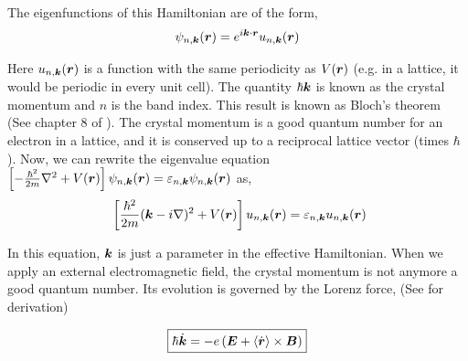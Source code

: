\documentclass{report}
\renewcommand\vec[1]{\ensuremath\boldsymbol{#1}} %
\begin{document}
The eigenfunctions of this Hamiltonian are of the form,
$$\psi_{n, \vec{k}} (\vec{r}) = e^{i \vec{k}\cdot \vec{r}} u_{n,\vec{k}} (\vec{r})$$

Here $u_{n,\vec{k}} (\vec{r})$ is a function with the same periodicity as $V(\vec{r})$ (e.g. in a lattice, it would be periodic in every unit cell). The quantity $\hbar \vec{k}$ is known as the crystal momentum and $n$ is the band index. This result is known as Bloch's theorem (See chapter 8 of \cite{book:AshcroftMermin76}). The crystal momentum is a good quantum number for an electron in a lattice, and it is conserved up to a reciprocal lattice vector (times $\hbar$).
Now, we can rewrite the eigenvalue equation $\left[-\frac{\hbar^2}{2m}\nabla^2 + V(\vec{r}) \right] \psi_{n, \vec{k}}(\vec{r}) = \varepsilon_{n,\vec{k}} \psi_{n, \vec{k}}(\vec{r})$ as,
\begin{equation}~\label{Eq:effectiveBlochEquation}
	\left[\frac{\hbar^2}{2m}(\vec{k} - i \nabla)^2 + V(\vec{r}) \right]u_{n,\vec{k}} (\vec{r}) = \varepsilon_{n,\vec{k}} u_{n,\vec{k}} (\vec{r})
\end{equation}

In this equation, $\vec{k}$ is just a parameter in the effective Hamiltonian. When we apply an external electromagnetic field, the crystal momentum is not anymore a good quantum number. Its evolution is governed by the Lorenz force, (See \cite{ralph2020berry} for derivation)

\begin{equation} \label{Eq:evolution-of-k}
	\boxed{\hbar \dot{\vec{k}} = -e\left(\vec{E} + \langle\dot{\vec{r}}\rangle \times \vec{B} \right)}
\end{equation}
\end{document}
